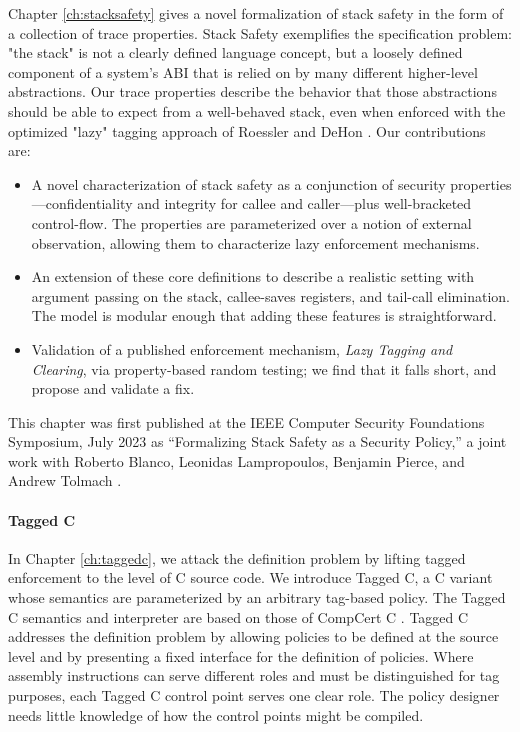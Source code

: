 \documentclass{report}
\begin{document}
Chapter \ref{ch:stacksafety} gives a novel formalization of stack safety in the
form of a collection of trace properties. Stack Safety exemplifies the specification problem:
"the stack" is not a clearly defined language concept, but a loosely defined component of
a system's ABI that is relied on by many different higher-level abstractions.
Our trace properties describe the behavior that those abstractions
should be able to expect from a well-behaved stack, even when enforced with the
optimized "lazy" tagging approach of Roessler and DeHon \cite{RoesslerD18}.
Our contributions are:

\begin{itemize}
  \item A novel characterization of stack safety as a conjunction
        of security properties---confidentiality and integrity for callee
        and caller---plus well-bracketed control-flow.
        The properties are parameterized over a notion of
        external observation, allowing them to characterize lazy enforcement
        mechanisms.
  \item An extension of these core definitions to
        describe a realistic setting with argument passing on the stack,
        callee-saves registers, and tail-call elimination. The model is
        modular enough that adding these features is straightforward.
  \item Validation of a published enforcement mechanism,
        \emph{Lazy Tagging and Clearing}, via property-based random testing; we find that
        it falls short, and propose and validate a fix.
\end{itemize}

This chapter was first published at the IEEE Computer Security Foundations Symposium,
July 2023 as ``Formalizing Stack Safety as a Security Policy,'' a
joint work with Roberto Blanco, Leonidas Lampropoulos, Benjamin Pierce, and Andrew Tolmach
\cite{Anderson23:StackSafety}.

\paragraph{Tagged C}

In Chapter \ref{ch:taggedc}, we attack the definition problem by lifting tagged enforcement
to the level of C source code. We introduce Tagged C, a C variant whose semantics are parameterized
by an arbitrary tag-based policy. The Tagged C semantics and interpreter are based on those of
CompCert C \cite{Leroy09:CompCert}. Tagged C addresses the definition problem by allowing policies
to be defined at the source level and by presenting a fixed interface for the definition of
policies. Where assembly instructions can serve different roles and must be distinguished for
tag purposes, each Tagged C control point serves one clear role. The policy designer needs little
knowledge of how the control points might be compiled.
\end{document}
